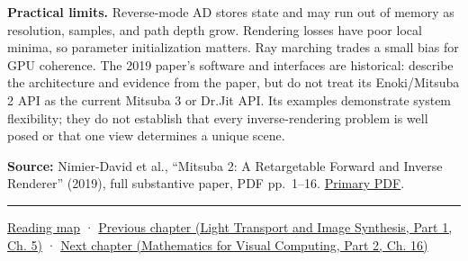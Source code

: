 \textbf{Practical limits.} Reverse-mode AD stores state and may run out of memory as resolution, samples, and path depth grow. Rendering losses have poor local minima, so parameter initialization matters. Ray marching trades a small bias for GPU coherence. The 2019 paper's software and interfaces are historical: describe the architecture and evidence from the paper, but do not treat its Enoki/Mitsuba 2 API as the current Mitsuba 3 or Dr.Jit API. Its examples demonstrate system flexibility; they do not establish that every inverse-rendering problem is well posed or that one view determines a unique scene.

\textbf{Source:} Nimier-David et al., ``Mitsuba 2: A Retargetable Forward and Inverse Renderer'' (2019), full substantive paper, PDF pp.~1--16. \href{https://rgl.s3.eu-central-1.amazonaws.com/media/papers/NimierDavidVicini2019Mitsuba2_7.pdf}{Primary PDF}.

\begin{center}\rule{0.5\linewidth}{0.5pt}\end{center}

\hyperref[volume-reading-map]{Reading map} · \href{../04-Light-Transport-and-Image-Synthesis-P01/main.pdf\#03-visual-computing-i-ch010-a-production-path-tracer-media-randomness-and-validation}{Previous chapter (Light Transport and Image Synthesis, Part 1, Ch. 5)} · \href{../02-Mathematics-for-Visual-Computing-P02/main.pdf\#03-visual-computing-i-ch012-probability-statistics-and-uncertainty}{Next chapter (Mathematics for Visual Computing, Part 2, Ch. 16)}
